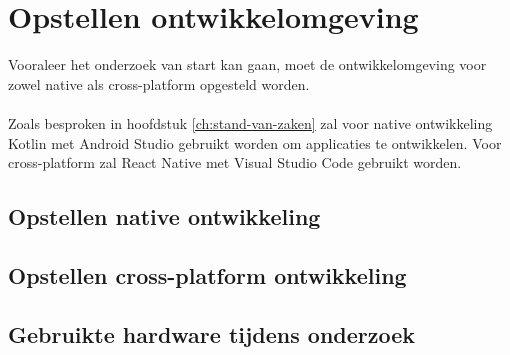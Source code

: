 
\chapter{Opstellen ontwikkelomgeving}%
\label{ch:ontwikkelomgeving}

Vooraleer het onderzoek van start kan gaan, moet de ontwikkelomgeving voor zowel native 
als cross-platform opgesteld worden. 
\\\\
Zoals besproken in hoofdstuk \ref{ch:stand-van-zaken} zal voor native ontwikkeling Kotlin 
met Android Studio gebruikt worden om applicaties te ontwikkelen. Voor cross-platform zal React Native 
met Visual Studio Code gebruikt worden.

\section{Opstellen native ontwikkeling}\label{se:native}



\section{Opstellen cross-platform ontwikkeling}



\section{Gebruikte hardware tijdens onderzoek}












